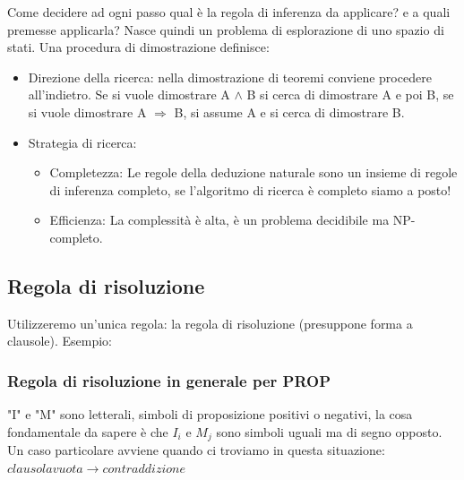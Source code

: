 \documentclass{article}
\begin{document}
Come decidere ad ogni passo qual è la regola di inferenza da applicare? e a quali premesse applicarla? Nasce quindi un problema di esplorazione di uno spazio di stati. \newline 
Una procedura di dimostrazione definisce: 
\begin{itemize}
    \item Direzione della ricerca: nella dimostrazione di teoremi conviene procedere all'indietro. Se si vuole dimostrare A $\land$ B si cerca di dimostrare A e poi B, se si vuole dimostrare A $\Rightarrow$ B, si assume A e si cerca di dimostrare B.
    \item Strategia di ricerca: \begin{itemize}
        \item Completezza: Le regole della deduzione naturale sono un insieme di regole di inferenza completo, se l’algoritmo di ricerca è completo siamo a posto!
        \item Efficienza: La complessità è alta, è un problema decidibile ma NP-completo.
    \end{itemize}
\end{itemize}

\subsection{Regola di risoluzione}
Utilizzeremo un’unica regola: la regola di risoluzione (presuppone forma a clausole). Esempio: \newline
{} \quad 
{}

\subsubsection{Regola di risoluzione in generale per PROP}
\quad
{} \newline
"I" e "M" sono letterali, simboli di proposizione positivi o negativi, la cosa fondamentale da sapere è che $I_i$ e $M_j$ sono simboli uguali ma di segno opposto. \newline
Un caso particolare avviene quando ci troviamo in questa situazione: \newline
{} $clausola vuota \rightarrow contraddizione$
\end{document}
